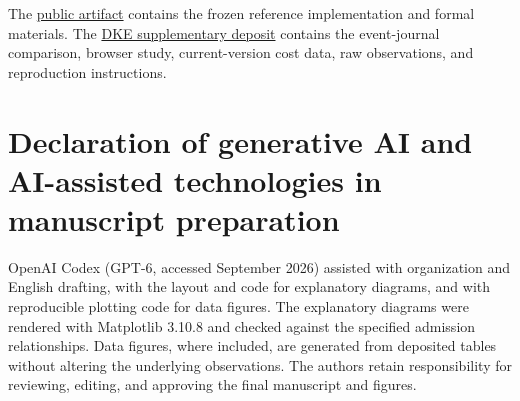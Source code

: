 \documentclass[preprint,12pt,authoryear]{elsarticle}
\begin{document}
The \href{https://github.com/lhh666-6/auto-dete}{public artifact} contains the frozen reference implementation and formal materials. The \href{https://github.com/lhh666-6/auto-dete/tree/main/DKE-supplement}{DKE supplementary deposit} contains the event-journal comparison, browser study, current-version cost data, raw observations, and reproduction instructions.

\section*{Declaration of generative AI and AI-assisted technologies in manuscript preparation}

OpenAI Codex (GPT-6, accessed September 2026) assisted with organization and English drafting, with the layout and code for explanatory diagrams, and with reproducible plotting code for data figures. The explanatory diagrams were rendered with Matplotlib 3.10.8 and checked against the specified admission relationships. Data figures, where included, are generated from deposited tables without altering the underlying observations. The authors retain responsibility for reviewing, editing, and approving the final manuscript and figures.



\end{document}
